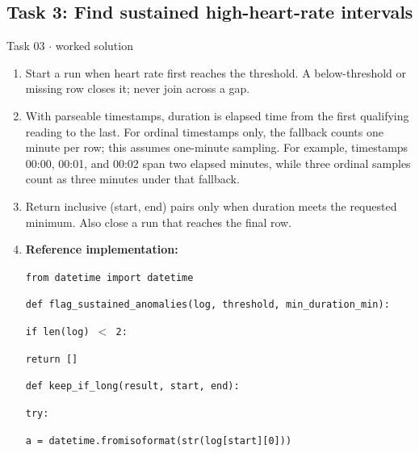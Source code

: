 \documentclass[11pt]{article}
\begin{document}
\begin{keepsection}\subsection{Task 3: Find sustained high-heart-rate intervals}

\begin{workedbox}{Task 03 \ensuremath{\cdot} worked solution}
\begin{enumerate}
\item Start a run when heart rate first reaches the threshold. A below-threshold or missing row closes it; never join across a gap.
\item With parseable timestamps, duration is elapsed time from the first qualifying reading to the last. For ordinal timestamps only, the fallback counts one minute per row; this assumes one-minute sampling. For example, timestamps 00:00, 00:01, and 00:02 span two elapsed minutes, while three ordinal samples count as three minutes under that fallback.
\item Return inclusive (start, end) pairs only when duration meets the requested minimum. Also close a run that reaches the final row.
\item {}
\textbf{Reference implementation:}
\begin{tcolorbox}[colback=Paperblue,colframe=Paperblue,boxrule=0pt,arc=0pt,left=7pt,right=7pt,top=5pt,bottom=5pt]\small\sloppy
\noindent\hspace*{0em}\texttt{from datetime import datetime}\par
\noindent\hspace*{0em}\texttt{def flag\_sustained\_anomalies(log, threshold, min\_duration\_min):}\par
\noindent\hspace*{1em}\texttt{if len(log) \ensuremath{<} 2:}\par
\noindent\hspace*{3em}\texttt{return []}\par
\noindent\hspace*{0em}\texttt{}\par
\noindent\hspace*{1em}\texttt{def keep\_if\_long(result, start, end):}\par
\noindent\hspace*{3em}\texttt{try:}\par
\noindent\hspace*{5em}\texttt{a = datetime.fromisoformat(str(log[start][0]))}\par

\end{tcolorbox}
\end{enumerate}
\end{workedbox}
\end{keepsection}
\end{document}
